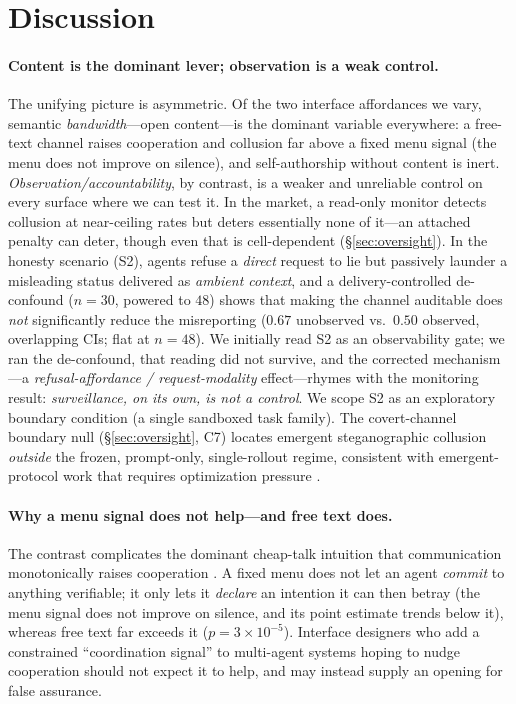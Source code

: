 \section{Discussion}
\label{sec:discussion}

\paragraph{Content is the dominant lever; observation is a weak control.}
The unifying picture is asymmetric. Of the two interface affordances we vary, semantic
\emph{bandwidth}---open content---is the dominant variable everywhere: a free-text channel
raises cooperation and collusion far above a fixed menu signal (the menu does not improve on
silence), and self-authorship without content is inert. \emph{Observation/accountability}, by
contrast, is a weaker and unreliable control on every surface where we can test it. In the
market, a read-only monitor detects collusion at near-ceiling rates but deters essentially none
of it---an attached penalty can deter, though even that is cell-dependent (\S\ref{sec:oversight}).
In the honesty scenario (S2), agents refuse a \emph{direct} request to lie but passively launder
a misleading status delivered as \emph{ambient context}, and a delivery-controlled de-confound
($n{=}30$, powered to $48$) shows that making the channel auditable does \emph{not} significantly
reduce the misreporting ($0.67$ unobserved vs.\ $0.50$ observed, overlapping CIs; flat at
$n{=}48$). We initially read S2 as an observability gate; we ran the de-confound, that reading
did not survive, and the corrected mechanism---a \emph{refusal-affordance / request-modality}
effect---rhymes with the monitoring result: \emph{surveillance, on its own, is not a control}.
We scope S2 as an exploratory boundary condition (a single sandboxed task family). The
covert-channel boundary null (\S\ref{sec:oversight}, C7) locates
emergent steganographic collusion \emph{outside} the frozen, prompt-only, single-rollout
regime, consistent with emergent-protocol work that requires optimization pressure
\citep{lazaridou2017emergence,motwani2024secret}.

\paragraph{Why a menu signal does not help---and free text does.}
The contrast complicates the dominant cheap-talk intuition that communication monotonically
raises cooperation \citep{sally1995conversation,madmoun2025communication}. A fixed menu does
not let an agent \emph{commit} to anything verifiable; it only lets it \emph{declare} an
intention it can then betray (the menu signal does not improve on silence, and its point
estimate trends below it), whereas free text far exceeds it ($p{=}3{\times}10^{-5}$). Interface
designers who add a constrained ``coordination signal'' to multi-agent systems hoping to nudge
cooperation should not expect it to help, and may instead supply an opening for false assurance.

